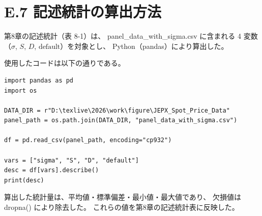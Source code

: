 \section*{E.7 記述統計の算出方法}

第8章の記述統計（表 8-1）は、
panel\_data\_with\_sigma.csv に含まれる
4 変数（$\sigma$, $S$, $D$, $\text{default}$）を対象とし、
Python（pandas）により算出した。

使用したコードは以下の通りである。

\begin{verbatim}
import pandas as pd
import os

DATA_DIR = r"D:\texlive\2026\work\figure\JEPX_Spot_Price_Data"
panel_path = os.path.join(DATA_DIR, "panel_data_with_sigma.csv")

df = pd.read_csv(panel_path, encoding="cp932")

vars = ["sigma", "S", "D", "default"]
desc = df[vars].describe()
print(desc)
\end{verbatim}

算出した統計量は、平均値・標準偏差・最小値・最大値であり、
欠損値は dropna() により除去した。
これらの値を第8章の記述統計表に反映した。

